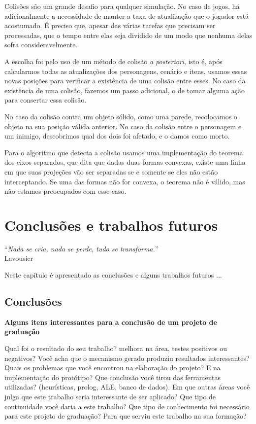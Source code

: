 \documentclass[brazil]{abnt}
\begin{document}
Colisões são um grande desafio para qualquer simulação. No caso de jogos, há adicionalmente a necessidade de manter a taxa de atualização que o jogador está acostumado. É preciso que, apesar das várias tarefas que precisam ser processadas, que o tempo entre elas seja dividido de um modo que nenhuma delas sofra consideravelmente.

A escolha foi pelo uso de um método de colisão \textit{a posteriori}, isto é, após calcularmos todas as atualizações dos personagens, cenário e itens, usamos essas novas posições para verificar a existência de uma colisão entre esses. No caso da existência de uma colisão, fazemos um passo adicional, o de tomar alguma ação para consertar essa colisão.

No caso da colisão contra um objeto sólido, como uma parede, recolocamos o objeto na sua posição válida anterior. No caso da colisão entre o personagem e um inimigo, descobrimos qual dos dois foi afetado, e o damos como morto.

Para o algoritmo que detecta a colisão usamos uma implementação do teorema dos eixos separados, que dita que dadas duas formas convexas, existe uma linha em que suas projeções vão ser separadas se e somente se eles não estão interceptando. Se uma das formas não for convexa, o teorema não é válido, mas não estamos preocupados com esse caso.

\chapter{Conclusões e trabalhos futuros\label{cap:conclusao}}

\vfill{}
\begin{flushright}{}``\emph{Nada se cria, nada se perde, tudo se
transforma.}''\\
{\small Lavousier}\end{flushright}{\small \par}
\vfill{}

Neste capítulo é apresentado as conclusões e alguns trabalhos futuros
...
\newpage


\section{Conclusões}

{\bf Alguns itens interessantes para a conclusão de um projeto de graduação}

Qual foi o resultado do seu trabalho? melhora na área, testes positivos ou negativos?
Você acha que o mecanismo gerado produziu resultados interessantes?
Quais os problemas que você encontrou na elaboração do projeto?
E na implementação do protótipo?
Que conclusão você tirou das ferramentas utilizadas? (heurísticas, prolog, ALE, banco de dados).
Em que outras áreas você julga que este trabalho seria interessante de ser aplicado?
Que tipo de continuidade você daria a este trabalho?
Que tipo de conhecimento foi necessário para este projeto de graduação?
Para que serviu este trabalho na sua formação?
\end{document}
